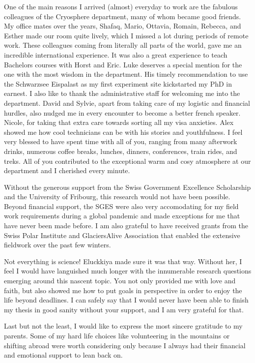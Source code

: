 One of the main reasons I arrived (almost) everyday to work are the fabulous colleagues of the Cryosphere
department, many of whom became good friends. My office mates over the years, Shafaq, Mario, Ottavia, Romain,
Rebecca, and Esther made our room quite lively, which I missed a lot during periods of remote work.
These colleagues coming from literally all parts of the world, gave me an incredible international experience.
It was also a great experience to teach Bachelors courses with Horst and Eric. Luke deserves a special mention
for the one with the most wisdom in the department. His timely recommendation to use the Schwarzsee Eispalast as
my first experiment site kickstarted my PhD in earnest. I also like to thank the administrative staff for
welcoming me into the department. David and Sylvie, apart from taking care of my logistic and financial hurdles,
also nudged me in every encounter to become a better french speaker. Nicole, for taking that extra care towards
sorting all my visa anxieties. Alex showed me how cool technicians can be with his stories and youthfulness. I
feel very blessed to have spent time with all of you, ranging from many afterwork drinks, numerous coffee
breaks, lunches, dinners, conferences, train rides, and treks. All of you contributed to the exceptional warm
and cosy atmosphere at our department and I cherished every minute. 

Without the generous support from the Swiss Government Excellence Scholarship and the University of
Fribourg, this research would not have been possible. Beyond financial support, the SGES were also very
accomodating for my field work requirements during a global pandemic and made exceptions for me that have never
been made before. I am also grateful to have received grants from the Swiss Polar Institute and GlaciersAlive
Association that enabled the extensive fieldwork over the past few winters. 

Not everything is science! Eluckkiya made sure it was that way. Without her, I feel I would have languished much
longer with the innumerable research questions emerging around this nascent topic. You not only provided me with
love and faith, but also showed me how to put goals in perspective in order to enjoy the life beyond deadlines.
I can safely say that I would never have been able to finish my thesis in good sanity without your support, and
I am very grateful for that. 

Last but not the least, I would like to express the most sincere gratitude to my parents. Some of my hard life
choices like volunteering in the mountains or shifting abroad were worth considering only because I always had
their financial and emotional support to lean back on.



